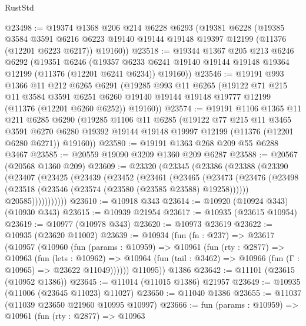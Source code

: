 \begin{lexlean}{RustStd}
\begin{coremodule}
{\begin{coremodule}
{{{{{{{{{{{{{{{{{{{{{{{{{{{{{{{{{{{{{{{{{{{{{{{{{{{{{{{{{{{{{{{{{{{{{{{{{{{{{{{{{{{{{@23498 := @19374
    @1368
    @206
    @214
    @6228
    @6293
    (@19381
      @6228
      (@19385
        @3584
        @3591
        @6216
        @6223
        @19140
        @19144
        @19148
        @19397
        @12199
        (@11376 (@12201 @6223 @6217))
        @19160))
@23518 := @19344
    @1367
    @205
    @213
    @6246
    @6292
    (@19351
      @6246
      (@19357 @6233 @6241 @19140 @19144 @19148 @19364 @12199 (@11376 (@12201 @6241 @6234)) @19160))
@23546 := @19191
    @993
    @1366
    @11
    @212
    @6265
    @6291
    (@19285
      @993
      @11
      @6265
      (@19122
        @71
        @215
        @11
        @3584
        @3591
        @6251
        @6260
        @19140
        @19144
        @19148
        @19777
        @12199
        (@11376 (@12201 @6260 @6252))
        @19160))
@23574 := @19191
    @1106
    @1365
    @11
    @211
    @6285
    @6290
    (@19285
      @1106
      @11
      @6285
      (@19122
        @77
        @215
        @11
        @3465
        @3591
        @6270
        @6280
        @19392
        @19144
        @19148
        @19997
        @12199
        (@11376 (@12201 @6280 @6271))
        @19160))
@23580 := @19191 @1363 @268 @209 @55 @6288 @3467
@23585 := @20559 @19090 @3209 @1360 @209 @6287
@23588 := @20567 (@20568 @1360 @209)
@23609 := @23320
    (@23345
      (@23386
        (@23388
          (@23390
            (@23407
              (@23425
                (@23439
                  (@23452
                    (@23461
                      (@23465
                        (@23473
                          (@23476
                            (@23498 (@23518 (@23546 (@23574 (@23580 (@23585 @23588) @19258))))))
                          @20585)))))))))))
@23610 := @10918 @343
@23614 := @10920 (@10924 @343) (@10930 @343)
@23615 := @10939 @21954
@23617 := @10935 (@23615 @10954)
@23619 := @10977 (@10978 @343)
@23620 := @10973 @23619
@23622 := @10935 (@23620 @11002)
@23639 := @10934
    (fun (fn : @237) =>
    @23617
      (@10957
        (@10960
          (fun (params : @10959) =>
          @10961
            (fun (rty : @2877) =>
            @10963
              (fun (lets : @10962) =>
              @10964 (fun (tail : @3462) => @10966 (fun (Γ : @10965) => @23622 @11049))))))
        @11095))
    @1386
@23642 := @11101 (@23615 (@10952 @1386))
@23645 := @11014 (@11015 @1386) @21957
@23649 := @10935 (@11006 (@23645 @11023) @11027)
@23650 := @11040 @1386
@23655 := @11037 (@11039 @23650 @21960 @10995 @10997)
@23666 := fun (params : @10959) =>
  @10961
    (fun (rty : @2877) =>
    @10963
}}}}}}}}}}}}}}}}}}}}}}}}}}}}}}}}}}}}}}}}}}}}}}}}}}}}}}}}}}}}}}}}}}}}}}}}}}}}}}}}}}}}}
\end{coremodule}}
\end{coremodule}
\end{lexlean}
